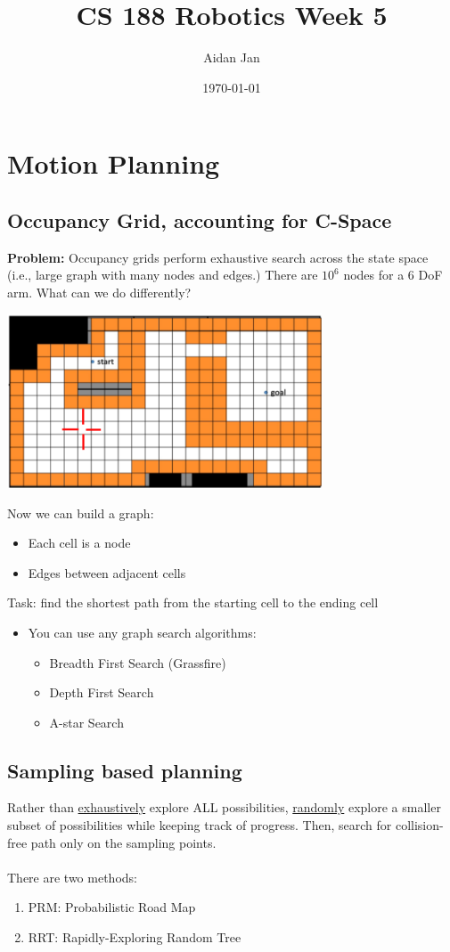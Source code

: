 \documentclass[10pt]{article}
\title{CS 188 Robotics Week 5}
\author{Aidan Jan}
\date{\today}
\begin{document}
\maketitle 

\section*{Motion Planning}
\subsection*{Occupancy Grid, accounting for C-Space}
\textbf{Problem:} Occupancy grids perform exhaustive search across the state space (i.e., large graph with many nodes and edges.)  There are $10^6$ nodes for a 6 DoF arm.  What can we do differently?
\begin{center} 
	\includegraphics*[width=0.7\textwidth]{L1_1.png} 
\end{center}
Now we can build a graph:
\begin{itemize}
	\item Each cell is a node
	\item Edges between adjacent cells
\end{itemize}
Task: find the shortest path from the starting cell to the ending cell
\begin{itemize}
	\item You can use any graph search algorithms:
	\begin{itemize}
        \item Breadth First Search (Grassfire)
        \item Depth First Search
        \item A-star Search
    \end{itemize}
\end{itemize}

\subsection*{Sampling based planning}
Rather than \underline{exhaustively} explore ALL possibilities, \underline{randomly} explore a smaller subset of possibilities while keeping track of progress.  Then, search for collision-free path only on the sampling points.\\\\
There are two methods:
\begin{enumerate}
    \item PRM: Probabilistic Road Map
    \item RRT: Rapidly-Exploring Random Tree
\end{enumerate}
\end{document}
